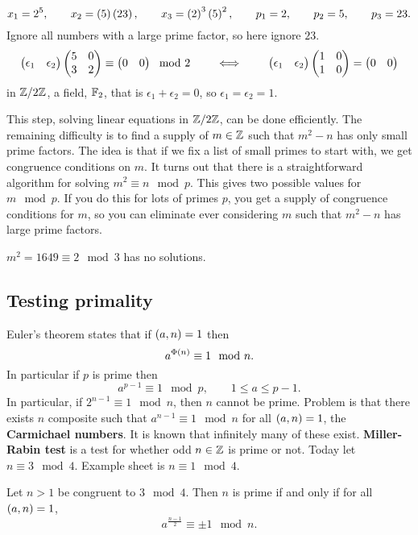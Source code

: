 \begin{example*}
$$ x_1 = 2^5, \qquad x_2 = \br{5}\br{23}, \qquad x_3 = \br{2}^3\br{5}^2, \qquad p_1 = 2, \qquad p_2 = 5, \qquad p_3 = 23. $$
Ignore all numbers with a large prime factor, so here ignore $ 23 $.
$$ \begin{pmatrix} \epsilon_1 & \epsilon_2 \end{pmatrix}\begin{pmatrix} 5 & 0 \\ 3 & 2 \end{pmatrix} \equiv \begin{pmatrix} 0 & 0 \end{pmatrix} \mod 2 \qquad \iff \qquad \begin{pmatrix} \epsilon_1 & \epsilon_2 \end{pmatrix}\begin{pmatrix} 1 & 0 \\ 1 & 0 \end{pmatrix} = \begin{pmatrix} 0 & 0 \end{pmatrix} $$
in $ \mathbb{Z} / 2\mathbb{Z} $, a field, $ \mathbb{F}_2 $, that is $ \epsilon_1 + \epsilon_2 = 0 $, so $ \epsilon_1 = \epsilon_2 = 1 $.
\end{example*}

This step, solving linear equations in $ \mathbb{Z} / 2\mathbb{Z} $, can be done efficiently. The remaining difficulty is to find a supply of $ m \in \mathbb{Z} $ such that $ m^2 - n $ has only small prime factors. The idea is that if we fix a list of small primes to start with, we get congruence conditions on $ m $. It turns out that there is a straightforward algorithm for solving $ m^2 \equiv n \mod p $. This gives two possible values for $ m \mod p $. If you do this for lots of primes $ p $, you get a supply of congruence conditions for $ m $, so you can eliminate ever considering $ m $ such that $ m^2 - n $ has large prime factors.

\begin{example*}
$ m^2 = 1649 \equiv 2 \mod 3 $ has no solutions.
\end{example*}

\pagebreak

\subsection{Testing primality}


Euler's theorem states that if $ \br{a, n} = 1 $ then
$$ a^{\Phi\br{n}} \equiv 1 \mod n. $$
In particular if $ p $ is prime then
$$ a^{p - 1} \equiv 1 \mod p, \qquad 1 \le a \le p - 1. $$
In particular, if $ 2^{n - 1} \equiv 1 \mod n $, then $ n $ cannot be prime. Problem is that there exists $ n $ composite such that $ a^{n - 1} \equiv 1 \mod n $ for all $ \br{a, n} = 1 $, the \textbf{Carmichael numbers}. It is known that infinitely many of these exist. \textbf{Miller-Rabin test} is a test for whether odd $ n \in \mathbb{Z} $ is prime or not. Today let $ n \equiv 3 \mod 4 $. Example sheet is $ n \equiv 1 \mod 4 $.

\begin{lemma}
\label{lem:30}
Let $ n > 1 $ be congruent to $ 3 \mod 4 $. Then $ n $ is prime if and only if for all $ \br{a, n} = 1 $,
$$ a^{\tfrac{n - 1}{2}} \equiv \pm 1 \mod n. $$
\end{lemma}

